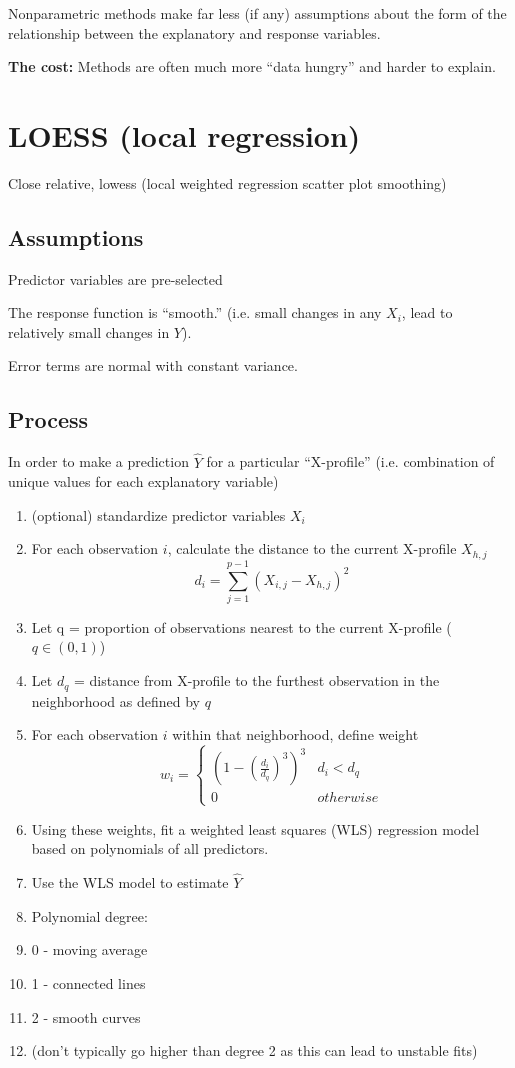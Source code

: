 \documentclass[12pt]{../notes}
\begin{document}
Nonparametric methods make far less (if any) assumptions about the form of the relationship between the explanatory and response variables. 

\nspace
\textbf{The cost:} Methods are often much more ``data hungry'' and harder to explain. 

\section{LOESS (\textbf{lo}cal \textbf{re}gression)}
Close relative, lowess (local weighted regression scatter plot smoothing)

\subsection{Assumptions}
\bi
\item Predictor variables are pre-selected
\item The response function is ``smooth.'' (i.e. small changes in any $X_i$, lead to relatively small changes in $Y$). 
\item Error terms are normal with constant variance. 
\ei

\subsection{Process}
In order to make a prediction $\hat{Y}$ for a particular ``X-profile'' (i.e. combination of unique values for each explanatory variable)
\begin{enumerate}
\item (optional) standardize predictor variables $X_i$
\item For each observation $i$, calculate the distance to the current X-profile $X_{h, j}$
$$d_i = \sum_{j=1}^{p-1}\left(X_{i,j} - X_{h,j}\right)^2$$
\item Let q = proportion of observations nearest to the current X-profile ($q\in (0, 1)$)
\item Let $d_q$ = distance from X-profile to the furthest observation in the neighborhood as defined by $q$
\item For each observation $i$ within that neighborhood, define weight 
$$w_i = 
\begin{cases}
\left(1-\left(\frac{d_i}{d_q}\right)^3\right)^3 & d_i < d_q \\
0 & otherwise
\end{cases}
$$
\item Using these weights, fit a weighted least squares (WLS) regression model based on polynomials of all predictors. 
\item Use the WLS model to estimate $\hat{Y}$
\bi
\item Polynomial degree:
\bi
\item 0 - moving average
\item 1 - connected lines
\item 2 - smooth curves
\item (don't typically go higher than degree 2 as this can lead to unstable fits)
\ei
\ei
\end{enumerate}
\end{document}
